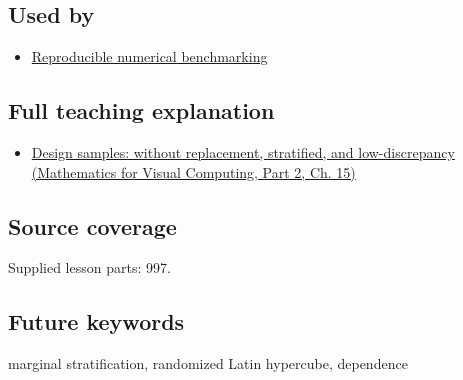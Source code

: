 \subsection{Used by}\label{appendix-1c5e85693a06-used-by}

\hypertarget{appendix-1c5e85693a06-used-by}{}

\begin{itemize}
\tightlist
\item
  \hyperref[appendix-b9db93e28371]{Reproducible numerical benchmarking}
\end{itemize}

\subsection{Full teaching explanation}\label{appendix-1c5e85693a06-full-teaching-explanation}

\hypertarget{appendix-1c5e85693a06-full-teaching-explanation}{}

\begin{itemize}
\tightlist
\item
  \href{../02-Mathematics-for-Visual-Computing-P02/main.pdf\#02-foundations-ii-ch031-design-samples-without-replacement-stratified-and-low-discrepancy}{Design samples: without replacement, stratified, and low-discrepancy (Mathematics for Visual Computing, Part 2, Ch. 15)}
\end{itemize}

\subsection{Source coverage}\label{appendix-1c5e85693a06-source-coverage}

\hypertarget{appendix-1c5e85693a06-source-coverage}{}

Supplied lesson parts: 997.

\subsection{Future keywords}\label{appendix-1c5e85693a06-future-keywords}

\hypertarget{appendix-1c5e85693a06-future-keywords}{}

marginal stratification, randomized Latin hypercube, dependence
